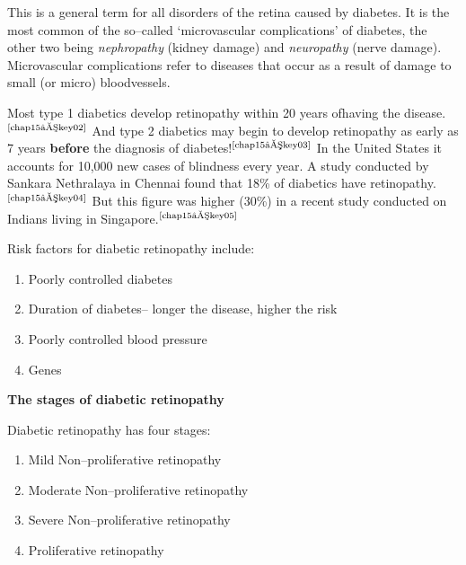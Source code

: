 This is a general term for all disorders of the retina caused by dia\-betes. It is the most common of the so–called ‘microvascular complications’ of diabetes, the other two being \textit{nephropathy} (kidney damage) and \textit{neuropathy} (nerve damage). Microvascular complications refer to diseases that occur as a result of damage to small (or micro) blood\break vessels.

Most type 1 diabetics develop retinopathy within 20 years of\break having the disease.$^{\text{\cite{chap15–key02}}}$ And type 2 diabetics may begin to develop retino\-pathy as early as 7 years \textbf{before} the diagnosis of diabetes!$^{\text{\cite{chap15–key03}}}$ In the United States it accounts for 10,000 new cases of blindness every year. A study conducted by Sankara Nethralaya in Chennai found that 18\% of diabetics have retinopathy.$^{\text{\cite{chap15–key04}}}$ But this figure was higher (30\%) in a recent study conducted on Indians living in Singapore.$^{\text{\cite{chap15–key05}}}$

\vskip 8pt
\noindent Risk factors for diabetic retinopathy include:
\begin{enumerate}[•]
\itemsep=0pt
\item Poorly controlled diabetes
\item Duration of diabetes– longer the disease, higher the risk
\item Poorly controlled blood pressure
\item Genes
\end{enumerate}

\noindent\textbf{The stages of diabetic retinopathy}

Diabetic retinopathy has four stages:
\begin{enumerate}
\itemsep=0pt
\item Mild Non–proliferative retinopathy
\item Moderate Non–proliferative retinopathy
\item Severe Non–proliferative retinopathy
\item Proliferative retinopathy
\end{enumerate}


